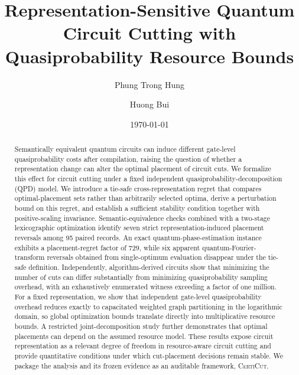 \documentclass[
  aps,
  pra,
  reprint,
  amsmath,
  amssymb,
  longbibliography,
  nofootinbib,
  floatfix
]{revtex4-2}
\theoremstyle{plain}
\newcommand{\CertiCut}{\textsc{CertiCut}}
\begin{document}
\title{Representation-Sensitive Quantum Circuit Cutting with Quasiprobability Resource Bounds}

\author{Phung Trong Hung}

\author{Huong Bui}

\date{\today}


\begin{abstract}
Semantically equivalent quantum circuits can induce different gate-level quasiprobability costs after compilation, raising the question of whether a representation change can alter the optimal placement of circuit cuts. We formalize this effect for circuit cutting under a fixed independent quasiprobability-decomposition (QPD) model. We introduce a tie-safe cross-representation regret that compares optimal-placement sets rather than arbitrarily selected optima, derive a perturbation bound on this regret, and establish a sufficient stability condition together with positive-scaling invariance. Semantic-equivalence checks combined with a two-stage lexicographic optimization identify seven strict representation-induced placement reversals among 95 paired records. An exact quantum-phase-estimation instance exhibits a placement-regret factor of $729$, while six apparent quantum-Fourier-transform reversals obtained from single-optimum evaluation disappear under the tie-safe definition. Independently, algorithm-derived circuits show that minimizing the number of cuts can differ substantially from minimizing quasiprobability sampling overhead, with an exhaustively enumerated witness exceeding a factor of one million. For a fixed representation, we show that independent gate-level quasiprobability overhead reduces exactly to capacitated weighted graph partitioning in the logarithmic domain, so global optimization bounds translate directly into multiplicative resource bounds. A restricted joint-decomposition study further demonstrates that optimal placements can depend on the assumed resource model. These results expose circuit representation as a relevant degree of freedom in resource-aware circuit cutting and provide quantitative conditions under which cut-placement decisions remain stable. We package the analysis and its frozen evidence as an auditable framework, \CertiCut{}.
\end{abstract}
\end{document}
